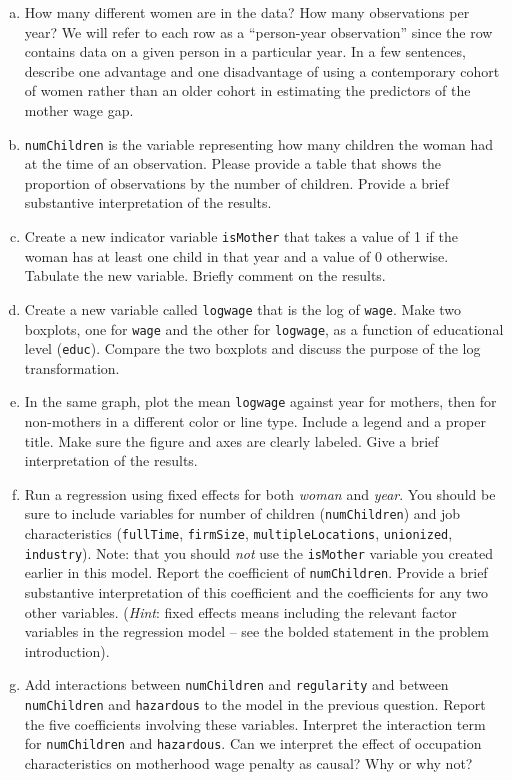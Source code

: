 \documentclass[11pt]{article}
\begin{document}
\begin{enumerate}[a.]
\item How many different women are in the data? How many observations 
  per year? We will refer to each row as a ``person-year observation'' 
  since the row contains data on a given person in a particular year.
  In a few sentences, describe one advantage and one disadvantage of using 
  a contemporary cohort of women rather than an older cohort in 
  estimating the predictors of the mother wage gap.
\item {\tt numChildren} is the variable representing how many children 
  the woman had at the time of an observation. Please provide a table 
  that shows the proportion of observations by the number of children.
  Provide a brief substantive interpretation of the results.
\item Create a new indicator variable {\tt isMother} that takes a value of 1 
  if the woman has at least one child in that year and a value 
  of 0 otherwise. Tabulate the new variable. Briefly comment on 
  the results.
\item Create a new variable called {\tt logwage} that is the log of {\tt wage}. 
  Make two boxplots, one for {\tt wage} and the other for {\tt logwage}, 
  as a function of educational level ({\tt educ}). Compare the two boxplots 
  and discuss the purpose of the log transformation. 
\item In the same graph, plot the mean {\tt logwage} against year for mothers, 
  then for non-mothers in a different color or line type. Include 
  a legend and a proper title. Make sure the figure and axes are 
  clearly labeled. Give a brief interpretation of the results.
\item Run a regression using fixed effects for both {\it woman} and {\it year}. 
You should be sure to include variables for number of children ({\tt numChildren})
and job characteristics ({\tt fullTime}, {\tt firmSize}, {\tt multipleLocations}, 
{\tt unionized}, {\tt industry}). Note: that you should \textit{not} use the {\tt isMother} 
variable you created earlier in this model. Report the coefficient of {\tt numChildren}. 
Provide a brief substantive interpretation of this coefficient and
the coefficients for any two other variables. (\textit{Hint}: fixed effects means including the relevant factor variables in the regression model -- see the bolded statement in the problem introduction).
\item {\bf \color{burntorange}{ OPTIONAL stretch problem:}} Add interactions between {\tt numChildren} and {\tt regularity} and between 
  {\tt numChildren} and {\tt hazardous} to the model in the previous question. Report the 
  five coefficients involving these variables. Interpret the interaction 
  term for {\tt numChildren} and {\tt hazardous}. Can we interpret 
  the effect of occupation characteristics on motherhood wage penalty 
  as causal? Why or why not?
\end{enumerate}
\end{document}
